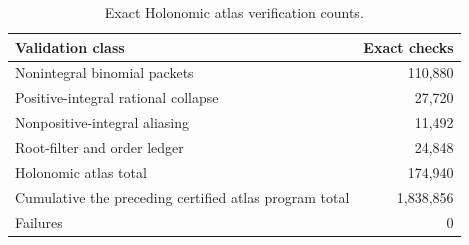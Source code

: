 \begin{table}[htbp]
\centering
\caption{Exact Holonomic atlas verification counts.}
\label{tab:block09-validation}
\begin{tabular}{@{}lr@{}}
\toprule
Validation class & Exact checks\\
\midrule
Nonintegral binomial packets & 110,880\\
Positive-integral rational collapse & 27,720\\
Nonpositive-integral aliasing & 11,492\\
Root-filter and order ledger & 24,848\\
\midrule
Holonomic atlas total & 174,940\\
Cumulative the preceding certified atlas program total & 1,838,856\\
Failures & 0\\
\bottomrule
\end{tabular}
\end{table}
